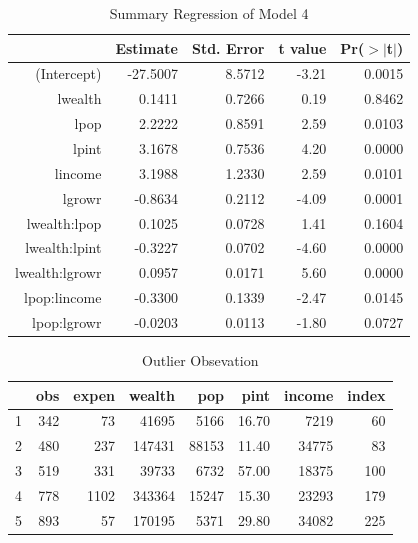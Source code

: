 \documentclass[11pt]{article}\usepackage[]{graphicx}\usepackage[]{color}
\begin{document}
\begin{center}
\begin{table}[ht]
\centering
\begin{tabular}{rrrrr}
  \hline
 & Estimate & Std. Error & t value & Pr($>$$|$t$|$) \\ 
  \hline
(Intercept) & -27.5007 & 8.5712 & -3.21 & 0.0015 \\ 
  lwealth & 0.1411 & 0.7266 & 0.19 & 0.8462 \\ 
  lpop & 2.2222 & 0.8591 & 2.59 & 0.0103 \\ 
  lpint & 3.1678 & 0.7536 & 4.20 & 0.0000 \\ 
  lincome & 3.1988 & 1.2330 & 2.59 & 0.0101 \\ 
  lgrowr & -0.8634 & 0.2112 & -4.09 & 0.0001 \\ 
  lwealth:lpop & 0.1025 & 0.0728 & 1.41 & 0.1604 \\ 
  lwealth:lpint & -0.3227 & 0.0702 & -4.60 & 0.0000 \\ 
  lwealth:lgrowr & 0.0957 & 0.0171 & 5.60 & 0.0000 \\ 
  lpop:lincome & -0.3300 & 0.1339 & -2.47 & 0.0145 \\ 
  lpop:lgrowr & -0.0203 & 0.0113 & -1.80 & 0.0727 \\ 
   \hline
\end{tabular}
\caption{Summary Regression of Model 4} 
\label{reg_summary_4}
\end{table}

\end{center}

\begin{center}
\begin{table}[ht]
\centering
\begin{tabular}{rrrrrrrr}
  \hline
 & obs & expen & wealth & pop & pint & income & index \\ 
  \hline
1 & 342 &  73 & 41695 & 5166 & 16.70 & 7219 &  60 \\ 
  2 & 480 & 237 & 147431 & 88153 & 11.40 & 34775 &  83 \\ 
  3 & 519 & 331 & 39733 & 6732 & 57.00 & 18375 & 100 \\ 
  4 & 778 & 1102 & 343364 & 15247 & 15.30 & 23293 & 179 \\ 
  5 & 893 &  57 & 170195 & 5371 & 29.80 & 34082 & 225 \\ 
   \hline
\end{tabular}
\caption{Outlier Obsevation} 
\label{outlier_obs}
\end{table}

\end{center}
\end{document}
